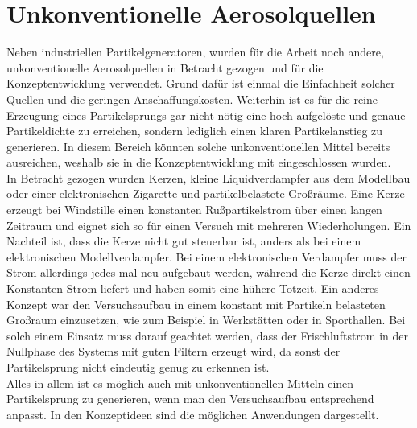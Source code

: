 \section{Unkonventionelle Aerosolquellen}
Neben industriellen Partikelgeneratoren, wurden f\"{u}r die Arbeit noch andere, unkonventionelle Aerosolquellen in Betracht gezogen und f\"{u}r die Konzeptentwicklung verwendet. Grund daf\"{u}r ist einmal die Einfachheit solcher Quellen und die geringen Anschaffungskosten. Weiterhin ist es f\"{u}r die reine Erzeugung eines Partikelsprungs gar nicht n\"{o}tig eine hoch aufgel\"{o}ste und genaue Partikeldichte zu erreichen, sondern lediglich einen klaren Partikelanstieg zu generieren. In diesem Bereich k\"{o}nnten solche unkonventionellen Mittel bereits ausreichen, weshalb sie in die Konzeptentwicklung mit eingeschlossen wurden.\\
In Betracht gezogen wurden Kerzen, kleine Liquidverdampfer aus dem Modellbau oder einer elektronischen Zigarette und partikelbelastete Gro{\ss}r\"{a}ume. Eine Kerze erzeugt bei Windstille einen konstanten Ru{\ss}partikelstrom \"{u}ber einen langen Zeitraum und eignet sich so f\"{u}r einen Versuch mit mehreren Wiederholungen. Ein Nachteil ist, dass die Kerze nicht gut steuerbar ist, anders als bei einem elektronischen Modellverdampfer. Bei einem elektronischen Verdampfer muss der Strom allerdings jedes mal neu aufgebaut werden, w\"{a}hrend die Kerze direkt einen Konstanten Strom liefert und haben somit eine h\"{u}here Totzeit. Ein anderes Konzept war den Versuchsaufbau in einem konstant mit Partikeln belasteten Gro{\ss}raum einzusetzen, wie zum Beispiel in Werkst\"{a}tten oder in Sporthallen. Bei solch einem Einsatz muss darauf geachtet werden, dass der Frischluftstrom in der Nullphase des Systems mit guten Filtern erzeugt wird, da sonst der Partikelsprung nicht eindeutig genug zu erkennen ist.\\
Alles in allem ist es m\"{o}glich auch mit unkonventionellen Mitteln einen Partikelsprung zu generieren, wenn man den Versuchsaufbau entsprechend anpasst. In den Konzeptideen sind die m\"{o}glichen Anwendungen dargestellt.